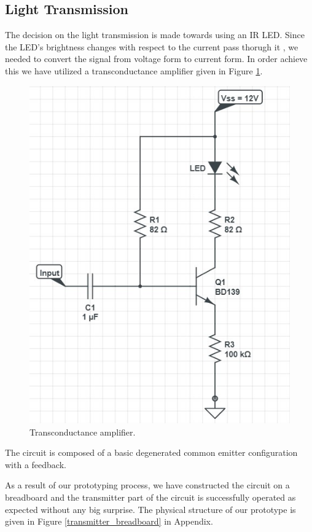 \documentclass[a4paper,10pt]{IEEEtran}
\begin{document}
\subsection{Light Transmission}
The decision on the light transmission is made towards using an IR LED. Since the LED's brightness changes with respect to the current pass thorugh it , we needed to convert the signal from voltage form to current form. In order achieve this we have utilized a transconductance amplifier given in Figure \ref{transconductance}. 
\begin{figure}[htbp!]
    \centering
    \includegraphics[width = 1\linewidth]{Led Driver Circuit.jpg}
    \caption{Transconductance amplifier.}
    \label{transconductance}
\end{figure} 
The circuit is composed of a basic degenerated common emitter configuration with a feedback. 

As a result of our prototyping process, we have constructed the circuit on a breadboard and the transmitter part of the circuit is successfully operated as expected without any big surprise. The physical structure of our prototype is given in Figure \ref{transmitter_breadboard} in Appendix.
\end{document}
